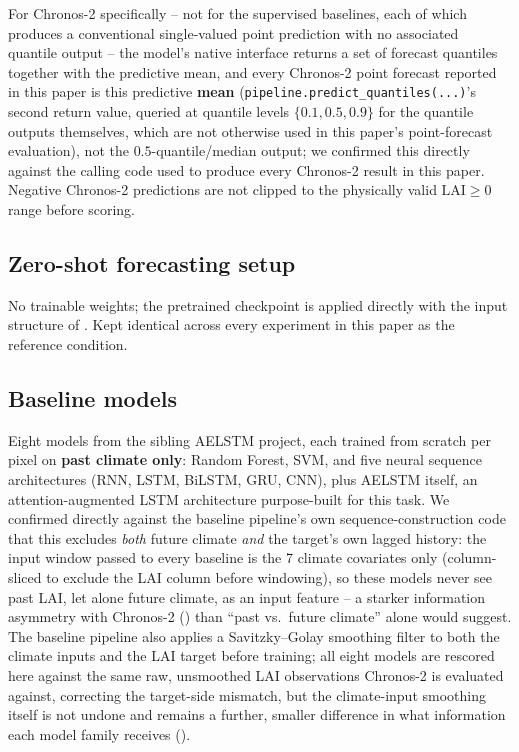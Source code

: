 \documentclass[11pt]{article}
\begin{document}
For Chronos-2 specifically -- not for the supervised baselines, each of which produces a
conventional single-valued point prediction with no associated quantile output -- the model's
native interface returns a set of forecast quantiles together with the predictive mean, and every
Chronos-2 point forecast reported in this paper is this predictive \textbf{mean}
(\texttt{pipeline.predict\_quantiles(...)}'s second return value, queried at quantile levels
$\{0.1, 0.5, 0.9\}$ for the quantile outputs themselves, which are not otherwise used in this
paper's point-forecast evaluation), not the $0.5$-quantile/median output; we confirmed this
directly against the calling code used to produce every Chronos-2 result in this paper. Negative
Chronos-2 predictions are not clipped to the physically valid $\mathrm{LAI} \geq 0$ range before
scoring.

\subsection{Zero-shot forecasting setup}
\label{sec:methods-zeroshot}

No trainable weights; the pretrained checkpoint is applied directly with the input structure of
. Kept identical across every experiment in this paper as the
reference condition.

\subsection{Baseline models}
\label{sec:methods-baselines}

Eight models from the sibling AELSTM project, each trained from scratch per pixel on
\textbf{past climate only}: Random Forest, SVM, and five neural sequence architectures (RNN,
LSTM, BiLSTM, GRU, CNN), plus AELSTM itself, an attention-augmented LSTM architecture purpose-built
for this task. We confirmed directly against the baseline pipeline's own sequence-construction code
that this excludes \emph{both} future climate \emph{and} the target's own lagged history: the input
window passed to every baseline is the 7 climate covariates only (column-sliced to exclude the LAI
column before windowing), so these models never see past LAI, let alone future climate, as an
input feature -- a starker information asymmetry with Chronos-2 ()
than ``past vs.\ future climate'' alone would suggest. The baseline pipeline also applies a
Savitzky--Golay smoothing filter to both the climate inputs and the LAI target before training; all
eight models are rescored here against the same raw, unsmoothed LAI observations Chronos-2 is
evaluated against, correcting the target-side mismatch, but the climate-input smoothing itself is
not undone and remains a further, smaller difference in what information each model family
receives ().
\end{document}
